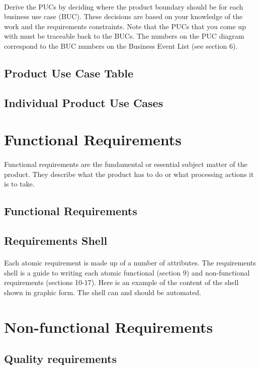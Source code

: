 \documentclass[12pt,a4paper]{article}
\begin{document}
\paragraph{}
Derive the PUCs by deciding where the product boundary should be for each business use case (BUC). These decisions are based on your knowledge of the work and the requirements constraints. Note that the PUCs that you come up with must be traceable back to the BUCs. The numbers on the PUC diagram correspond to the BUC numbers on the Business Event List (see section 6).
\subsection{Product Use Case Table}
\subsection{Individual Product Use Cases}
\pagebreak
\section{Functional Requirements}
\paragraph{}
Functional requirements are the fundamental or essential subject matter of the product. They describe what the product has to do or what processing actions it is to take.
\subsection{Functional Requirements}
\subsection{Requirements Shell}
\paragraph{}
Each atomic requirement is made up of a number of attributes. The requirements shell is a guide to writing each atomic functional (section 9) and non-functional requirements (sections 10-17). Here is an example of the content of the shell shown in graphic form. The shell can and should be automated.
\pagebreak
\section{Non-functional Requirements}
\subsection{Quality requirements}
\end{document}
